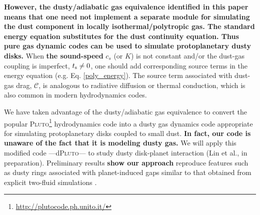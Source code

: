{\bf However, the dusty/adiabatic gas equivalence identified in this paper
means that one need not implement a separate module for simulating the dust component in
locally isothermal/polytropic gas. The standard energy equation substitutes for the dust continuity 
equation. Thus pure gas dynamic codes can be used to simulate protoplanetary dusty disks. 
} %
When {\bf the sound-speed} $c_s$ (or $K$) is not constant and/or the dust-gas coupling is imperfect, $t_\mathrm{s}\neq0$, one
should add corresponding source terms in the energy equation
(e.g. Eq. \ref{poly_energy}). 
The source term associated with dust-gas drag, $\mathcal{C}$, is 
analogous to radiative diffusion \citep{price15} or thermal 
conduction, which is also common in modern hydrodynamics codes.       

We have taken advantage of the dusty/adiabatic gas equivalence to 
convert the popular
\textsc{Pluto}\footnote{\url{http://plutocode.ph.unito.it/}}      
hydrodynamics code \citep{mignone07} into a dusty gas dynamics code appropriate for
simulating protoplanetary disks coupled to small dust. {\bf In fact,
  our code is unaware of the fact that it is modeling dusty gas.} 
We will apply 
this modified code ---d\textsc{Pluto}--- to study dusty disk-planet interaction (Lin et al., 
in preparation). 
Preliminary results {\bf show our approach} %
reproduce features such as dusty rings associated with 
planet-induced gaps similar to that obtained from explicit two-fluid
simulations \citep[e.g.][]{dong17}. 



